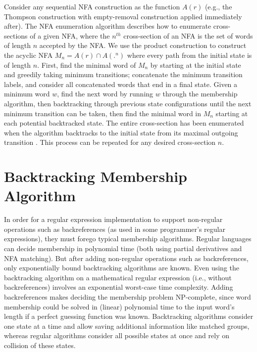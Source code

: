 Consider any sequential NFA construction as the function $A(r)$ (e.g., the Thompson construction with empty-removal construction applied immediately after). The NFA enumeration algorithm describes how to enumerate cross-sections of a given NFA, where the $n^{th}$ cross-section of an NFA is the set of words of length $n$ accepted by the NFA. We use the product construction to construct the acyclic NFA $M_n = A(r) \cap A(.^n)$ where every path from the initial state is of length $n$. First, find the minimal word of $M_n$ by starting at the initial state and greedily taking minimum transitions; concatenate the minimum transition labels, and consider all concatenated words that end in a final state. Given a minimum word $w$, find the next word by running $w$ through the membership algorithm, then backtracking through previous state configurations until the next minimum transition can be taken, then find the minimal word in $M_n$ starting at each potential backtracked state. The entire cross-section has been enumerated when the algorithm backtracks to the initial state from its maximal outgoing transition \cite{nfa-enum}. This process can be repeated for any desired cross-section $n$.





\section{Backtracking Membership Algorithm}
\label{sec:Backtracking Membership Algorithm}
In order for a regular expression implementation to support non-regular operations such as backreferences (as used in some programmer's regular expressions), they must forego typical membership algorithms. Regular languages can decide membership in polynomial time (both using partial derivatives and NFA matching). But after adding non-regular operations such as backreferences, only exponentially bound backtracking algorithms are known. Even using the backtracking algorithm on a mathematical regular expression (i.e., without backreferences) involves an exponential worst-case time complexity. Adding backreferences makes deciding the membership problem NP-complete, since word membership could be solved in (linear) polynomial time to the input word's length if a perfect guessing function was known. Backtracking algorithms consider one state at a time and allow saving additional information like matched groups, whereas regular algorithms consider all possible states at once and rely on collision of these states.

